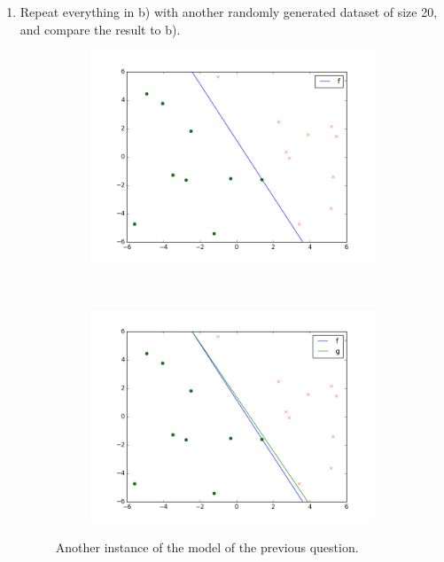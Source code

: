 \documentclass{article}
\begin{document}
\begin{enumerate}[label=(\alph*)]
\item Repeat everything in b) with another randomly generated dataset of size 20, and compare the result to b).

\begin{figure}[H]
    \centering
    \begin{subfigure}[t]{0.5\textwidth}
        \centering
\includegraphics[scale=0.35]{images/3_a.png} 
    \end{subfigure}%
    ~ 
    \begin{subfigure}[t]{0.5\textwidth}
        \centering
\includegraphics[scale=0.35]{images/3_b.png} 
    \end{subfigure}
    \caption{Another instance of the model of the previous question.}
\end{figure}


\end{enumerate}
\end{document}
